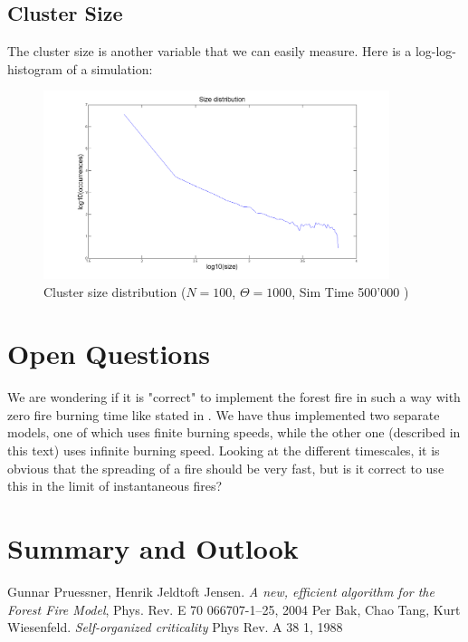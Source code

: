 \documentclass[11pt]{article}
\begin{document}
\subsection{Cluster Size}
The cluster size is another variable that we can easily measure. Here is a log-log-histogram of a simulation:
\begin{figure}[H]
\includegraphics[width=0.9\textwidth,keepaspectratio=true]{Pictures/Size_dist_1.png}
\caption{Cluster size distribution ($N=100$, $\Theta= 1000 $, Sim Time 500'000  ) }
\end{figure}


\section{Open Questions}
We are wondering if it is "correct" to implement the forest fire in such a way with zero fire burning time like stated in \cite{pruessner04}. We have thus implemented two separate models, one of which uses finite burning speeds, while the other one (described in this text) uses infinite burning speed. Looking at the different timescales, it is obvious that the spreading of a fire should be very fast, but is it correct to use this in the limit of instantaneous fires?



\section{Summary and Outlook}

\begin{thebibliography}{9}
	Gunnar Pruessner, Henrik Jeldtoft Jensen.
	\emph {A new, efficient algorithm for the Forest Fire Model},
	Phys. Rev. E 70 066707-1--25,
	2004
	Per Bak, Chao Tang, Kurt Wiesenfeld.
	\emph{Self-organized criticality}
	Phys Rev. A 38 1,
	1988
\end{thebibliography}
\end{document}
